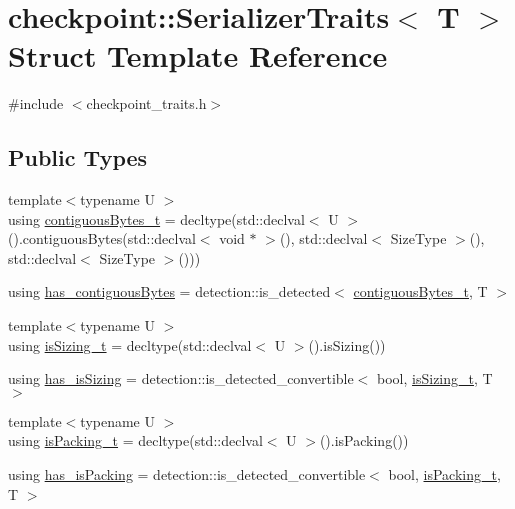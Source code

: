 \hypertarget{structcheckpoint_1_1_serializer_traits}{}\section{checkpoint\+:\+:Serializer\+Traits$<$ T $>$ Struct Template Reference}
\label{structcheckpoint_1_1_serializer_traits}


{\ttfamily \#include $<$checkpoint\+\_\+traits.\+h$>$}

\subsection*{Public Types}
\begin{DoxyCompactItemize}
\item 
{\footnotesize template$<$typename U $>$ }\\using \hyperlink{structcheckpoint_1_1_serializer_traits_aaa8510ef21bb5aac75f50f8038091b86}{contiguous\+Bytes\+\_\+t} = decltype(std\+::declval$<$ U $>$().contiguous\+Bytes(std\+::declval$<$ void $\ast$ $>$(), std\+::declval$<$ Size\+Type $>$(), std\+::declval$<$ Size\+Type $>$()))
\item 
using \hyperlink{structcheckpoint_1_1_serializer_traits_aee3349b1b0e4064b7f3a0baf29580835}{has\+\_\+contiguous\+Bytes} = detection\+::is\+\_\+detected$<$ \hyperlink{structcheckpoint_1_1_serializer_traits_aaa8510ef21bb5aac75f50f8038091b86}{contiguous\+Bytes\+\_\+t}, T $>$
\item 
{\footnotesize template$<$typename U $>$ }\\using \hyperlink{structcheckpoint_1_1_serializer_traits_a7b2ce347c816a50063e37b1216076814}{is\+Sizing\+\_\+t} = decltype(std\+::declval$<$ U $>$().is\+Sizing())
\item 
using \hyperlink{structcheckpoint_1_1_serializer_traits_a4dda444a377178bddaa8448a639f9735}{has\+\_\+is\+Sizing} = detection\+::is\+\_\+detected\+\_\+convertible$<$ bool, \hyperlink{structcheckpoint_1_1_serializer_traits_a7b2ce347c816a50063e37b1216076814}{is\+Sizing\+\_\+t}, T $>$
\item 
{\footnotesize template$<$typename U $>$ }\\using \hyperlink{structcheckpoint_1_1_serializer_traits_aeec71e5f15a9dc7e8a265d40a65518b0}{is\+Packing\+\_\+t} = decltype(std\+::declval$<$ U $>$().is\+Packing())
\item 
using \hyperlink{structcheckpoint_1_1_serializer_traits_a8b54c38de0887bf25f179e0f065af3fb}{has\+\_\+is\+Packing} = detection\+::is\+\_\+detected\+\_\+convertible$<$ bool, \hyperlink{structcheckpoint_1_1_serializer_traits_aeec71e5f15a9dc7e8a265d40a65518b0}{is\+Packing\+\_\+t}, T $>$

\end{DoxyCompactItemize}
